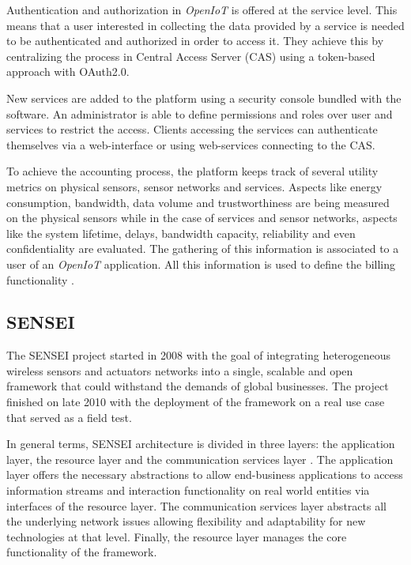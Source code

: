 \documentclass[journal]{IEEEtran}
\begin{document}
  Authentication and authorization in \emph{OpenIoT} is offered at the service level. This means that a user interested in collecting the data provided by a service is needed to be authenticated and authorized in order to access it. They achieve this by centralizing the process in Central Access Server (CAS) using a token-based approach with OAuth2.0. 

  New services are added to the platform using a security console bundled with the software. An administrator is able to define permissions and roles over user and services to restrict the access. Clients accessing the services can authenticate themselves via a web-interface or using web-services connecting to the CAS.

  To achieve the accounting process, the platform keeps track of several utility metrics on physical sensors, sensor networks and services. Aspects like energy consumption, bandwidth, data volume and trustworthiness are being measured on the physical sensors while in the case of services and sensor networks, aspects like the system lifetime, delays, bandwidth capacity, reliability and even confidentiality are evaluated. The gathering of this information is associated to a user of an \emph{OpenIoT} application. All this information is used to define the billing functionality \cite{Calbimonte}.

  \subsection{SENSEI}
  The SENSEI project \cite{SENSEIWeb} started in 2008 with the goal of integrating heterogeneous wireless sensors and actuators networks into a single, scalable and open framework that could withstand the demands of global businesses. The project finished on late 2010 with the deployment of the framework on a real use case that served as a field test.
  
  In general terms, SENSEI architecture is divided in three layers: the application layer, the resource layer and the communication services layer \cite{Tsiatsis2010}. The application layer offers the necessary abstractions to allow end-business applications to access information streams and interaction functionality on real world entities via interfaces of the resource layer. The communication services layer abstracts all the underlying network issues allowing flexibility and adaptability for new technologies at that level. Finally, the resource layer manages the core functionality of the framework. 
\end{document}
